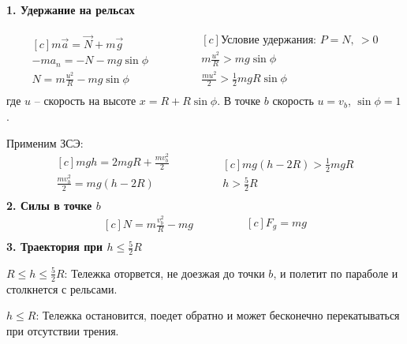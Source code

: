 \documentclass[a5paper,10pt]{article}
\begin{document}
\paragraph{1. Удержание на рельсах}
\begin{equation*}
    \begin{aligned}[c]
        m\vec{a}=\vec{N}+m\vec{g}\\
        -ma_n=-N-mg\sin{\phi}\\
        N=m{}\frac{u^2}{R}-mg\sin\phi\\
    \end{aligned}
        \qquad\qquad
    \begin{aligned}[c]
        \text{Условие удержания: $P=N,\ >0$}\\
        m{}\frac{u^2}{R}>mg\sin\phi\\
        \frac{mu^2}{2}>\frac{1}{2}mgR\sin\phi\\
    \end{aligned}
\end{equation*}
где $u$ -- скорость на высоте $x=R+R\sin\phi$. В точке $b$ скорость $u=v_b$, $\sin\phi=1$.

Применим ЗСЭ:
\begin{equation*}
    \begin{aligned}[c]
        mgh=2mgR+\frac{mv_b^2}{2}\\
        \frac{mv_b^2}{2}=mg(h-2R)\\
    \end{aligned}
        \qquad\qquad
    \begin{aligned}[c]
        mg(h-2R)>\frac{1}{2}mgR\\
        h>\frac{5}{2}R
    \end{aligned}
\end{equation*}
\textbf{2. Силы в точке $b$}
\begin{equation*}
    \begin{aligned}[c]
        N=m{}\frac{v_b^2}{R}-mg\\
    \end{aligned}
        \qquad\qquad
    \begin{aligned}[c]
        F_g=mg\\
    \end{aligned}
\end{equation*}
\textbf{3. Траектория при $h\leq\frac{5}{2}R$}

$R\leq{}h\leq\frac{5}{2}R$: Тележка оторвется, не доезжая до точки $b$, и полетит по параболе и столкнется с рельсами.

$h\leq{}R$: Тележка остановится, поедет обратно и может бесконечно перекатываться при отсутствии трения.
\end{document}
